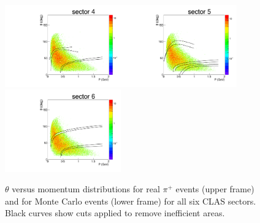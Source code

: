 \begin{figure}[htp]
\begin{center}
\begin{minipage}{.99\textwidth}
\begin{framed}
\includegraphics[width=5cm]{pictures/other_cuts/fiduch/th_vs_p_pip_sim/pip_th_vs_p_sim_sector4.pdf}\includegraphics[width=5cm]{pictures/other_cuts/fiduch/th_vs_p_pip_sim/pip_th_vs_p_sim_sector5.pdf}\includegraphics[width=5cm]{pictures/other_cuts/fiduch/th_vs_p_pip_sim/pip_th_vs_p_sim_sector6.pdf}
\end{framed}
\end{minipage}
\caption{\small $\theta$ versus momentum distributions for real $\pi^{+}$ events (upper frame)  and for Monte Carlo events (lower frame) for all six CLAS sectors. Black curves show cuts applied to remove inefficient areas. \label{fig:other_cuts_positive_th_vs_p_piplus}}
\end{center}
\end{figure}










